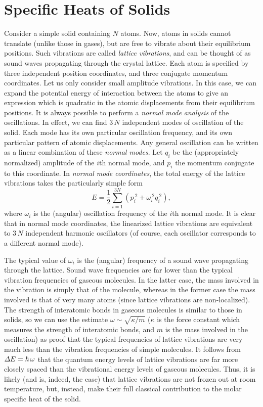 \section{Specific Heats of Solids}\label{s7sound}
Consider a simple solid containing $N$ atoms. Now, atoms in solids cannot
translate (unlike those in gases), but 
 are free to vibrate about their equilibrium positions. 
Such vibrations are  called {\em lattice vibrations}, and  can be thought of
as sound waves propagating
through the crystal lattice. Each atom is specified by three independent position
coordinates, and three conjugate momentum coordinates. Let us 
only consider small amplitude vibrations.
In this case, we can expand the potential energy of interaction between the atoms 
to give an expression which is quadratic in the atomic displacements
from their equilibrium positions. It is always possible to perform a 
{\em normal mode analysis}
of the oscillations. In effect, we can find $3\,N$ independent modes of oscillation of the solid. 
Each mode has its own particular oscillation frequency, and its own particular pattern
 of atomic displacements. 
Any general oscillation can be written as a linear combination of these 
{\em normal modes}. 
Let $q_i$ be the (appropriately normalized) amplitude of the $i$th normal mode,
 and $p_i$ the momentum conjugate to this
coordinate. In  {\em normal mode coordinates}, the total energy of the lattice vibrations takes the
particularly simple form
\begin{equation}
E = \frac{1}{2}\sum_{i=1}^{3 N} (p_i^{~2} + \omega_i^{~2} q_i^{~2}),\label{e7.137}
\end{equation}
where $\omega_i$ is the (angular) oscillation frequency of the $i$th normal mode. It is
clear that in normal mode coordinates, the linearized lattice vibrations are equivalent to
$3\,N$ independent harmonic oscillators (of course, each oscillator corresponds to a different normal
mode).

 The typical value of $\omega_i$ is the (angular) frequency of a sound wave 
propagating through the lattice. Sound wave frequencies are far lower than the
typical vibration frequencies of gaseous molecules. In the latter case, the mass involved in the
vibration is simply that of the molecule, whereas in the former case the mass involved is that
of very many atoms (since lattice vibrations are non-localized). The strength of
interatomic bonds in gaseous molecules is similar to those in solids, so we can use the estimate
$\omega\sim \sqrt{\kappa/m}$ ($\kappa$ is the force constant which measures the strength of
interatomic bonds, and $m$ is the mass involved in the oscillation) as proof that the typical
frequencies of lattice vibrations are  very
much less than the vibration frequencies of simple molecules.
It follows from ${\mit\Delta} E = \hbar\, \omega$ that the quantum energy levels of lattice vibrations are
far more closely spaced than the vibrational energy levels of gaseous molecules. Thus, it is
likely (and is, indeed, the case) that lattice vibrations are not frozen out at room temperature,
but, instead, make their full classical contribution to the molar specific heat of the solid. 

